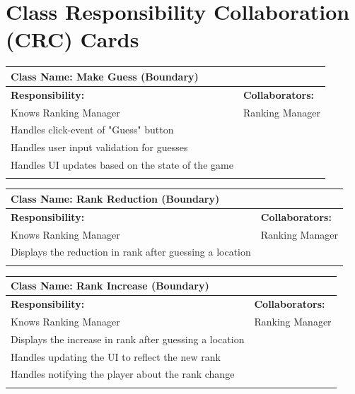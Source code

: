 \documentclass[]{article}
\begin{document}
	
\section{Class Responsibility Collaboration (CRC) Cards}
\label{sec:class_responsibility_collaboration_crc_cards}

	\begin{table}[H]
		\centering
		\begin{tabular}{|p{8cm}|p{8cm}|}
		\hline 
		 \multicolumn{2}{|l|}{\textbf{Class Name:} Make Guess (Boundary)} \\
		\hline
		\textbf{Responsibility:} & \textbf{Collaborators:} \\
		\hline
		Knows Ranking Manager & Ranking Manager \\
		Handles click-event of "Guess" button & \\
		Handles user input validation for guesses & \\
		Handles UI updates based on the state of the game & \\
		\vspace{1in} & \\
		\hline
		\end{tabular}
	\end{table}
	
	\begin{table}[H]
		\centering
		\begin{tabular}{|p{8cm}|p{8cm}|}
		\hline 
		 \multicolumn{2}{|l|}{\textbf{Class Name:} Rank Reduction (Boundary)} \\
		\hline
		\textbf{Responsibility:} & \textbf{Collaborators:} \\
		\hline
		Knows Ranking Manager & Ranking Manager \\
		Displays the reduction in rank after guessing a location & \\
		\vspace{1in} & \\
		\hline
		\end{tabular}
	\end{table}

	\begin{table}[H]
		\centering
		\begin{tabular}{|p{8cm}|p{8cm}|}
		\hline 
		 \multicolumn{2}{|l|}{\textbf{Class Name:} Rank Increase (Boundary)} \\
		\hline
		\textbf{Responsibility:} & \textbf{Collaborators:} \\
		\hline
		Knows Ranking Manager & Ranking Manager \\
		Displays the increase in rank after guessing a location & \\
		Handles updating the UI to reflect the new rank & \\
		Handles notifying the player about the rank change & \\
		\vspace{1in} & \\
		\hline
		\end{tabular}
	\end{table}
\end{document}
